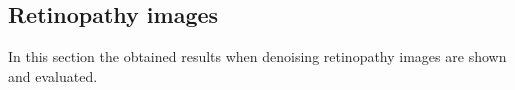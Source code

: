 \subsection{Retinopathy images} 
In this section the obtained results when denoising retinopathy images are shown and evaluated.
%
%
%
%
%
%
%
%
%



